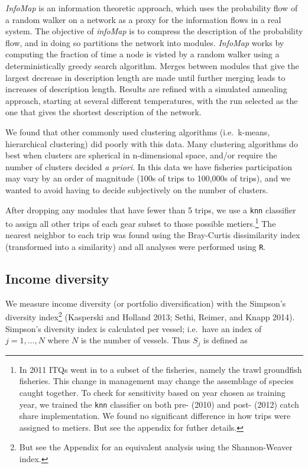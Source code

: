 \documentclass[]{article}
\begin{document}
\emph{InfoMap} is an information theoretic approach, which uses the
probability flow of a random walker on a network as a proxy for the
information flows in a real system. The objective of \emph{infoMap} is
to compress the description of the probability flow, and in doing so
partitions the network into modules. \emph{InfoMap} works by computing
the fraction of time a node is visted by a random walker using a
deterministically greedy search algorithm. Merges between modules that
give the largest decrease in description length are made until further
merging leads to increases of description length. Results are refined
with a simulated annealing approach, starting at several different
temperatures, with the run selected as the one that gives the shortest
description of the network.

We found that other commonly used clustering algorithms (i.e.~k-means,
hierarchical clustering) did poorly with this data. Many clustering
algorithms do best when clusters are spherical in n-dimensional space,
and/or require the number of clusters decided \emph{a priori}. In this
data we have fisheries participation may vary by an order of magnitude
(100s of trips to 100,000s of trips), and we wanted to avoid having to
decide subjectively on the number of clusters.

After dropping any modules that have fewer than 5 trips, we use a
\texttt{knn} classifier to assign all other trips of each gear subset to
those possible metiers.\footnote{In 2011 ITQs went in to a subset of the
  fisheries, namely the trawl groundfish fisheries. This change in
  management may change the assemblage of species caught together. To
  check for sensitivity based on year chosen as training year, we
  trained the \texttt{knn} classifier on both pre- (2010) and post-
  (2012) catch share implementation. We found no significant difference
  in how trips were assigned to metiers. But see the appendix for futher
  details.} The nearest neighbor to each trip was found using the
Bray-Curtis dissimilarity index (transformed into a similarity) and all
analyses were performed using \texttt{R}.

\subsection{Income diversity}\label{income-diversity}

We measure income diversity (or portfolio diversification) with the
Simpson's diversity index\footnote{But see the Appendix for an
  equivalent analysis using the Shannon-Weaver index.} (Kasperski and
Holland 2013; Sethi, Reimer, and Knapp 2014). Simpson's diversity index
is calculated per vessel; i.e.~have an index of $j=1,\dots,N$ where $N$
is the number of vessels. Thus $S_j$ is defined as
\end{document}
